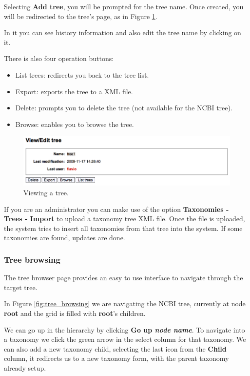 Selecting \textbf{Add tree}, you will be prompted for the tree name. Once created, you will be
redirected to the tree's page, as in Figure \ref{fig:view_tree}.

In it you can see history information and also edit the tree name by clicking on it.

There is also four operation buttons:

\begin{itemize}
  \item List trees: redirects you back to the tree list.
  \item Export: exports the tree to a XML file.
  \item Delete: prompts you to delete the tree (not available for the NCBI tree).
  \item Browse: enables you to browse the tree.
\end{itemize}

\begin{figure}[H]
  \centering
    \includegraphics[scale=0.4]{view_tree.png}
  \caption{Viewing a tree.}
  \label{fig:view_tree}
\end{figure}

If you are an administrator you can make use of the option \textbf{Taxonomies - Trees - Import}
to upload a taxonomy tree XML file. Once the file is uploaded, the system tries to insert
all taxonomies from that tree into the system. If some taxonomies are found, updates are done.

\subsubsection{Tree browsing}

The tree browser page provides an easy to use interface to navigate through the target tree.

In Figure \ref{fig:tree_browsing} we are navigating the NCBI tree, currently at node \textbf{root}
and the grid is filled with \textbf{root}'s children.

We can go up in the hierarchy by clicking \textbf{Go up \textit{node name}}. To navigate into
a taxonomy we click the green arrow in the select column for that taxonomy. We can also
add a new taxonomy child, selecting the last icon from the \textbf{Child} column, it redirects us
to a new taxonomy form, with the parent taxonomy already setup.

